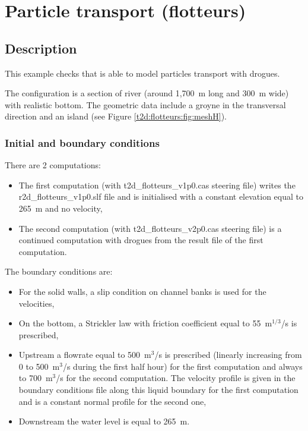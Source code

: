\chapter{Particle transport (flotteurs)}

\section{Description}

This example checks that  is able to model particles transport with
drogues.

The configuration is a section of river (around 1,700~m long and 300~m wide)
with realistic bottom.
The geometric data include a groyne in the transversal direction and an island
(see Figure \ref{t2d:flotteurs:fig:meshH}).

\subsection{Initial and boundary conditions}

There are 2 computations:
\begin{itemize}
\item The first computation (with t2d\_flotteurs\_v1p0.cas steering file)
writes the r2d\_flotteurs\_v1p0.slf file
and is initialised with a constant elevation equal to 265~m and no velocity,
\item The second computation (with t2d\_flotteurs\_v2p0.cas steering file)
is a continued computation with drogues from the result file of the
first computation.
\end{itemize}

The boundary conditions are:
\begin{itemize}
\item For the solid walls, a slip condition on channel banks is used for the
velocities,
\item On the bottom, a Strickler law with friction coefficient equal to
55~m$^{1/3}$/s is prescribed,
\item Upstream a flowrate equal to 500~m$^3$/s is prescribed
(linearly increasing from 0 to 500~m$^3$/s during the first half hour)
for the first computation and always to 700~m$^3$/s for the second computation.
The velocity profile is given in the boundary conditions file along this liquid
boundary for the first computation and is a constant normal profile for the
second one,
\item Downstream the water level is equal to 265~m.
\end{itemize}

